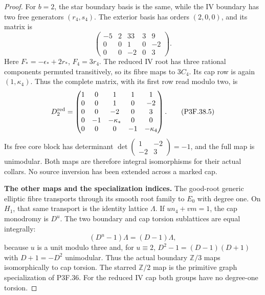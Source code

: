 \begin{proof}
For \(b=2\), the star boundary basis is the same, while the IV
boundary has two free generators \((r_4,s_4)\). The exterior
basis has orders \((2,0,0)\), and its matrix is
\[
 \begin{pmatrix}-5&2&33&3&9\\0&0&1&0&-2\\0&0&-2&0&3\end{pmatrix}.
\]
Here \(F_*=-\epsilon_*+2r_*\), \(F_4=3r_4\). The reduced
IV root has three rational components permuted transitively, so
its fibre maps to \(3C_4\). Its cap row is again
\((1,\kappa_4)\). Thus the complete matrix, with its first row
read modulo two, is
\[
 D_2^{\rm red}=\begin{pmatrix}
 1&0&1&1&1\\0&0&1&0&-2\\0&0&-2&0&3\\
 0&-1&-\kappa_*&0&0\\0&0&0&-1&-\kappa_4
 \end{pmatrix}.                                               \tag{P3F.38.5}
\]
Its free core block has determinant
\(\det\left(\begin{smallmatrix}1&-2\\-2&3\end{smallmatrix}\right)=-1\),
and the full map is unimodular. Both maps are therefore integral
isomorphisms for their actual collars. No source inversion has
been extended across a marked cap.

\par\medskip\noindent\textbf{The other maps and the specialization indices.}
The good-root generic elliptic fibre transports through its smooth
root family to \(E_0\) with degree one. On \(H_1\), that
same transport is the identity lattice \(\Lambda\). If
\(u n_4+vm=1\), the cap monodromy is \(D^u\). The two
boundary and cap torsion sublattices are equal integrally:
\[
 (D^u-1)\Lambda=(D-1)\Lambda,
\]
because \(u\) is a unit modulo three and, for \(u\equiv2\),
\(D^2-1=(D-1)(D+1)\) with \(D+1=-D^2\) unimodular.
Thus the actual boundary \(\mathbb Z/3\) maps isomorphically
to cap torsion. The starred \(\mathbb Z/2\) map is the
primitive graph specialization of P3F.36. For the reduced IV cap
both groups have no degree-one torsion.


\end{proof}
